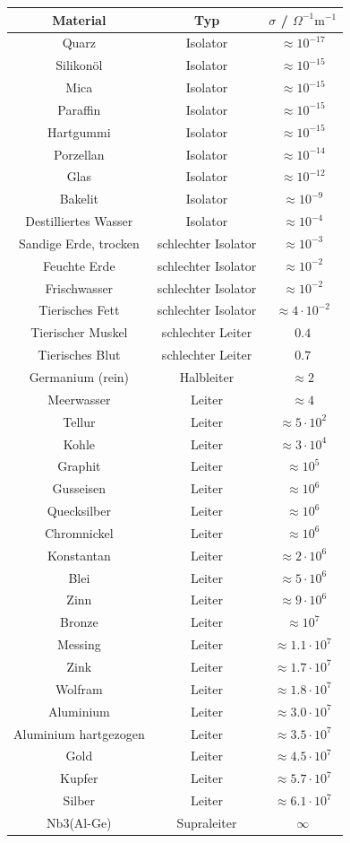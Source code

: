 \begin{center}
\begin{tabular}{ccc}\hline
\textbf{Material}&\textbf{Typ}&\textbf{$\sigma$ / $\Omega^{-1}\text{m}^{-1}$}\\\hline
Quarz &Isolator&$\approx 10^{-17}$\\
Silikonöl&Isolator&$\approx 10^{-15}$\\
Mica&Isolator&$\approx 10^{-15}$\\
Paraffin&Isolator&$\approx 10^{-15}$\\
Hartgummi &Isolator&$\approx 10^{-15}$\\
Porzellan&Isolator&$\approx 10^{-14}$\\
Glas&Isolator&$\approx 10^{-12}$\\
Bakelit&Isolator&$\approx 10^{-9}$\\
Destilliertes Wasser&Isolator&$\approx 10^{-4}$\\
Sandige Erde, trocken &schlechter Isolator&$\approx 10^{-3}$\\
Feuchte Erde &schlechter Isolator&$\approx 10^{-2}$\\
Frischwasser &schlechter Isolator&$\approx 10^{-2}$\\
Tierisches Fett&schlechter Isolator&$\approx 4\cdot 10^{-2}$\\
Tierischer Muskel &schlechter Leiter&$0.4$\\
Tierisches Blut &schlechter Leiter&$0.7$\\
Germanium (rein)&Halbleiter&$\approx 2$\\
Meerwasser &Leiter&$\approx 4$\\
Tellur&Leiter&$\approx 5\cdot 10^{2}$\\
Kohle &Leiter&$\approx 3\cdot 10^{4}$\\
Graphit &Leiter&$\approx 10^{5}$\\
Gusseisen &Leiter&$\approx 10^{6}$\\
Quecksilber &Leiter&$\approx 10^{6}$\\
Chromnickel&Leiter&$\approx 10^{6}$\\
Konstantan &Leiter&$\approx 2\cdot 10^{6}$\\
Blei&Leiter&$\approx 5\cdot 10^{6}$\\
Zinn &Leiter&$\approx 9\cdot 10^{6}$\\
Bronze &Leiter&$\approx 10^{7}$\\
Messing &Leiter&$\approx 1.1\cdot 10^{7}$\\
Zink &Leiter&$\approx 1.7\cdot 10^{7}$\\
Wolfram&Leiter&$\approx 1.8\cdot 10^{7}$\\
Aluminium &Leiter&$\approx 3.0\cdot 10^{7}$\\
Aluminium hartgezogen &Leiter&$\approx 3.5\cdot 10^{7}$\\
Gold&Leiter&$\approx 4.5\cdot 10^{7}$\\
Kupfer &Leiter&$\approx 5.7\cdot 10^{7}$\\
Silber&Leiter&$\approx 6.1\cdot 10^{7}$\\
Nb3(Al-Ge)&Supraleiter&$\infty$\\\hline
\end{tabular}
\end{center}